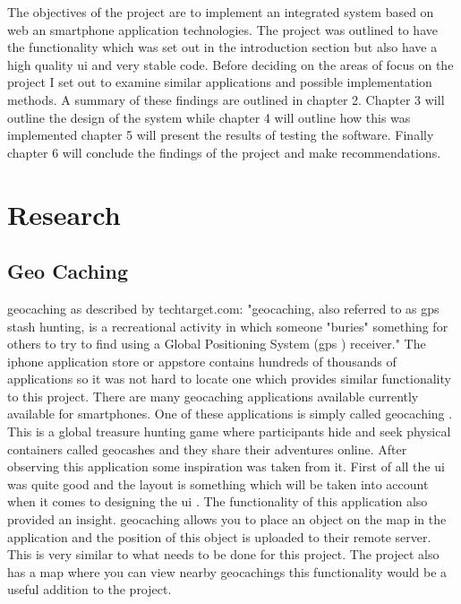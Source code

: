 \documentclass[12pt]{article}
\begin{document}
The objectives of the project are to implement an integrated system based on web an \gls{smartphone} application technologies. The project was outlined to have the functionality which was set out in the introduction section but also have a high quality \gls{ui} and very stable code. Before deciding on the areas of focus on the project I set out to examine similar applications and possible implementation methods. A summary of these findings are outlined in chapter 2. Chapter 3 will outline the design of the system while chapter 4 will outline how this was implemented chapter 5 will present the results of testing the software. Finally chapter 6 will conclude the findings of the project and make recommendations.   


\newpage



\section{Research}


\subsection{Geo Caching}

\gls{geocaching} as described by techtarget.com: "\gls{geocaching}, also referred to as \gls{gps} stash hunting, is a recreational activity in which someone "buries" something for others to try to find using a Global Positioning System (\gls{gps} ) receiver."
The \gls{iphone} application store or \gls{appstore} contains hundreds of thousands of applications so it was not hard to locate one which provides similar functionality to this project.
There are many \gls{geocaching}  applications available currently available for smartphones.
One of these applications is simply called \gls{geocaching} . This is a global treasure hunting game where participants hide and seek physical containers called geocashes and they share their adventures online.
After observing this application some inspiration was taken from it. First of all the \gls{ui}  was quite good and the layout is something which will be taken into account when it comes to designing the \gls{ui} . The functionality of this application also provided an insight. \gls{geocaching}  allows you to place an object on the map in the application and the position of this object is uploaded to their remote server. This is very similar to what needs to be done for this project. The project also has a map where you can view nearby \glspl{geocaching} this functionality would be a useful addition to the project.
\end{document}

